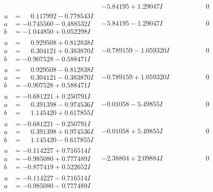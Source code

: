 \documentclass[1p]{elsarticle_modified}
\theoremstyle{definition}
\begin{document}
$$\begin{array}{c|c|c}
 & -5.84195 + 1.29047 I & \phantom{-0.000000 } 0 \\ \hline\begin{aligned}
u &= \phantom{-}0.117992 - 0.778543 I \\
a &= -0.745560 - 0.488532 I \\
b &= -1.044850 + 0.052298 I\end{aligned}
 & -5.84195 - 1.29047 I & \phantom{-0.000000 } 0 \\ \hline\begin{aligned}
u &= \phantom{-}0.929508 + 0.812838 I \\
a &= \phantom{-}0.304121 + 0.383870 I \\
b &= -0.907528 - 0.588471 I\end{aligned}
 & -0.789159 - 1.059320 I & \phantom{-0.000000 } 0 \\ \hline\begin{aligned}
u &= \phantom{-}0.929508 - 0.812838 I \\
a &= \phantom{-}0.304121 - 0.383870 I \\
b &= -0.907528 + 0.588471 I\end{aligned}
 & -0.789159 + 1.059320 I & \phantom{-0.000000 } 0 \\ \hline\begin{aligned}
u &= -0.681221 + 0.250791 I \\
a &= \phantom{-}0.391398 - 0.974536 I \\
b &= \phantom{-}1.145420 + 0.617855 I\end{aligned}
 & -0.01058 - 5.49855 I & \phantom{-0.000000 } 0 \\ \hline\begin{aligned}
u &= -0.681221 - 0.250791 I \\
a &= \phantom{-}0.391398 + 0.974536 I \\
b &= \phantom{-}1.145420 - 0.617855 I\end{aligned}
 & -0.01058 + 5.49855 I & \phantom{-0.000000 } 0 \\ \hline\begin{aligned}
u &= -0.114227 + 0.716514 I \\
a &= -0.985080 + 0.777489 I \\
b &= -0.877419 + 0.522652 I\end{aligned}
 & -2.38804 + 2.09884 I & \phantom{-0.000000 } 0 \\ \hline\begin{aligned}
u &= -0.114227 - 0.716514 I \\
a &= -0.985080 - 0.777489 I \\

\end{aligned}
\end{array}$$
\end{document}
